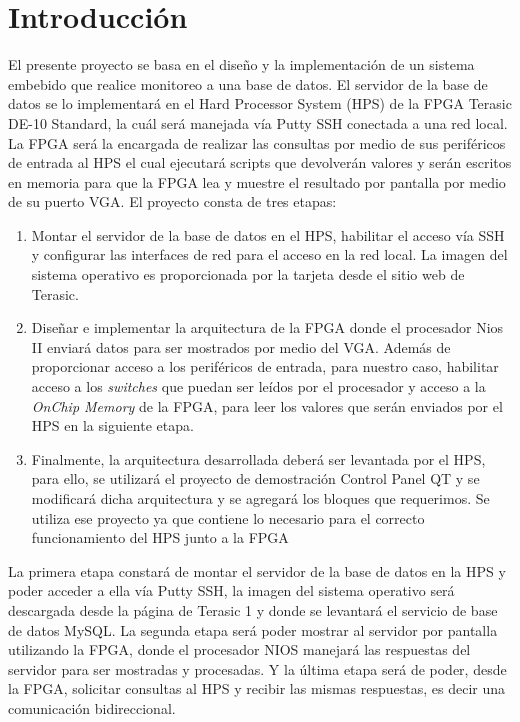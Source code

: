 \documentclass[conference]{IEEEtran}
\begin{document}
\section{Introducción}\label{sec:int}
El presente proyecto se basa en el diseño y la implementación de un sistema embebido que realice monitoreo a una base de datos. El servidor de la base de datos se lo implementará en el Hard Processor System (HPS) de la FPGA Terasic DE-10 Standard, la cuál será manejada vía Putty SSH conectada a una red local. La FPGA será la encargada de realizar las consultas por medio de sus periféricos de entrada al HPS el cual ejecutará scripts que devolverán valores y serán escritos en memoria para que la FPGA lea y muestre el resultado por pantalla por medio de su puerto VGA. El proyecto consta de tres etapas:
\begin{enumerate}
  \item Montar el servidor de la base de datos en el HPS, habilitar el acceso vía SSH y configurar las interfaces de red para el acceso en la red local. La imagen del sistema operativo es proporcionada por la tarjeta desde el sitio web de Terasic.
  \item Diseñar e implementar la arquitectura de la FPGA donde el procesador Nios II enviará datos para ser mostrados por medio del VGA. Además de proporcionar acceso a los periféricos de entrada, para nuestro caso, habilitar acceso a los \textit{switches} que puedan ser leídos por el procesador y acceso a la \textit{OnChip Memory} de la FPGA, para leer los valores que serán enviados por el HPS en la siguiente etapa.
  \item Finalmente, la arquitectura desarrollada deberá ser levantada por el HPS, para ello, se utilizará el proyecto de demostración Control Panel QT y se modificará dicha arquitectura y se agregará los bloques que requerimos. Se utiliza ese proyecto ya que contiene lo necesario para el correcto funcionamiento del HPS junto a la FPGA
\end{enumerate}
La primera etapa constará de montar el servidor de la base de datos en la HPS y poder acceder a ella vía Putty SSH, la imagen del sistema operativo será descargada desde la página de Terasic 1 y donde se levantará el servicio de base de datos MySQL. La segunda etapa será poder mostrar al servidor por pantalla utilizando la FPGA, donde el procesador NIOS manejará las respuestas del servidor para ser mostradas y procesadas. Y la última etapa será de poder, desde la FPGA, solicitar consultas al HPS y recibir las mismas respuestas, es decir una comunicación bidireccional.
\end{document}
